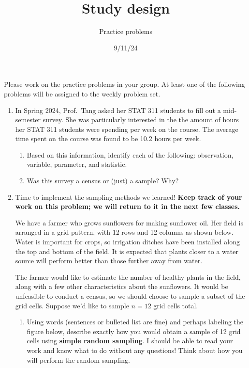 \documentclass[
  letterpaper,
  DIV=11,
  numbers=noendperiod]{scrartcl}
\title{Study design}
\author{Practice problems}
\date{9/11/24}
\providecommand{\tightlist}{%
  \setlength{\itemsep}{0pt}\setlength{\parskip}{0pt}}\usepackage{longtable,booktabs,array}
\begin{document}
\maketitle
\ifdefined\Shaded\renewenvironment{Shaded}{\begin{tcolorbox}[frame hidden, sharp corners, boxrule=0pt, borderline west={3pt}{0pt}{shadecolor}, breakable, interior hidden, enhanced]}{\end{tcolorbox}}\fi

Please work on the practice problems in your group. At least one of the
following problems will be assigned to the weekly problem set.

\begin{enumerate}
\def\labelenumi{\arabic{enumi}.}
\item
  In Spring 2024, Prof.~Tang asked her STAT 311 students to fill out a
  mid-semester survey. She was particularly interested in the the amount
  of hours her STAT 311 students were spending per week on the course.
  The average time spent on the course was found to be 10.2 hours per
  week.

  \begin{enumerate}
  \def\labelenumii{\alph{enumii}.}
  \tightlist
  \item
    Based on this information, identify each of the following:
    observation, variable, parameter, and statistic.
  \item
    Was this survey a census or (just) a sample? Why?
  \end{enumerate}
\item
  Time to implement the sampling methods we learned! \textbf{Keep track
  of your work on this problem; we will return to it in the next few
  classes.}

  We have a farmer who grows sunflowers for making sunflower oil. Her
  field is arranged in a grid pattern, with 12 rows and 12 columns as
  shown below. Water is important for crops, so irrigation ditches have
  been installed along the top and bottom of the field. It is expected
  that plants closer to a water source will perform better than those
  further away from water.

  The farmer would like to estimate the number of healthy plants in the
  field, along with a few other characteristics about the sunflowers. It
  would be unfeasible to conduct a census, so we should choose to sample
  a subset of the grid cells. Suppose we'd like to sample \(n = 12\)
  grid cells total.

  \begin{enumerate}
  \def\labelenumii{\alph{enumii}.}
  \item
    Using words (sentences or bulleted list are fine) and perhaps
    labeling the figure below, describe exactly how you would obtain a
    sample of 12 grid cells using \textbf{simple random sampling}. I
    should be able to read your work and know what to do without any
    questions! Think about how you will perform the random sampling.


\end{enumerate}
\end{enumerate}
\end{document}

